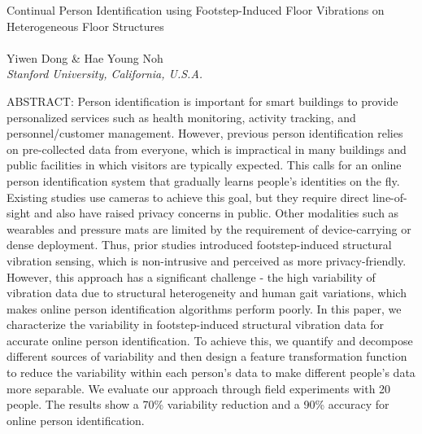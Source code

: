 \documentclass[11pt,letter]{article}
\begin{document}
\pagestyle{empty}
\parbox[][1.3in][t]{\textwidth}{%
  {\LARGE Continual Person Identification using Footstep-Induced Floor Vibrations on Heterogeneous Floor Structures\\~\\} 
  {\Large Yiwen Dong \& Hae Young Noh}\\
  \emph{\large Stanford University, California, U.S.A.}\medskip
  
}

\vspace{-0.1in}
\parbox[][2.5in][t]{\textwidth}{%
ABSTRACT: Person identification is important for smart buildings to provide personalized services such as health monitoring, activity tracking, and personnel/customer management. However, previous person identification relies on pre-collected data from everyone, which is impractical in many buildings and public facilities in which visitors are typically expected. This calls for an online person identification system that gradually learns people’s identities on the fly. Existing studies use cameras to achieve this goal, but they require direct line-of-sight and also have raised privacy concerns in public. Other modalities such as wearables and pressure mats are limited by the requirement of device-carrying or dense deployment. Thus, prior studies introduced footstep-induced structural vibration sensing, which is non-intrusive and perceived as more privacy-friendly. However, this approach has a significant challenge - the high variability of vibration data due to structural heterogeneity and human gait variations, which makes online person identification algorithms perform poorly. In this paper, we characterize the variability in footstep-induced structural vibration data for accurate online person identification. To achieve this, we quantify and decompose different sources of variability and then design a feature transformation function to reduce the variability within each person’s data to make different people's data more separable. We evaluate our approach through field experiments with 20 people. The results show a 70\% variability reduction and a 90\% accuracy for online person identification.
}
\end{document}
